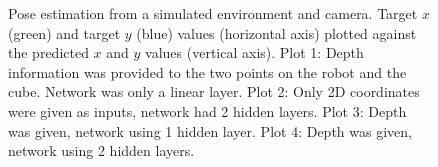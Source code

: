 \begin{figure}[h!]
    \caption{Pose estimation from a simulated environment and camera. Target
    $x$ (green) and target $y$ (blue) values (horizontal axis) plotted against
    the predicted $x$ and $y$ values (vertical axis).  Plot 1: Depth
    information was provided to the two points on the robot and the cube.
    Network was only a linear layer. Plot 2: Only 2D coordinates were given as
    inputs, network had 2 hidden layers.  Plot 3: Depth was given, network
    using 1 hidden layer.  Plot 4: Depth was given, network using 2 hidden
    layers.}

    \label{fig:pose-sim-corr}
    
\end{figure}
